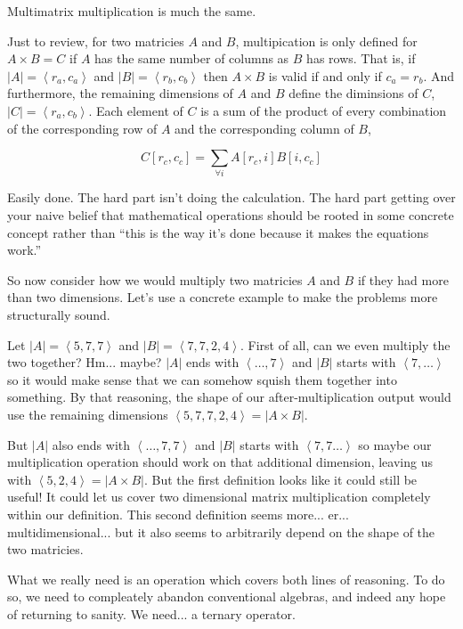 \documentclass[12pt]{book}
\theoremstyle{plain}
\theoremstyle{definition}
\theoremstyle{ppart}
\theoremstyle{case}
\theoremstyle{solution}
\newcommand{\shape}[1]{\left|#1\right|}
\begin{document}
Multimatrix multiplication is much the same.

Just to review, for two matricies $A$ and $B$, multipication is only defined
for $A \times B = C$ if $A$ has the same number of columns as $B$ has rows.
That is, if $\shape{A} = \left< r_a, c_a \right>$ and $\shape{B} = \left< r_b, c_b \right>$
then $A \times B$ is valid if and only if $c_a = r_b$. And furthermore,
the remaining dimensions of $A$ and $B$ define the diminsions of $C$,
$\shape{C} = \left< r_a, c_b \right>$. Each element of $C$ is a sum of the product of
every combination of the corresponding row of $A$ and the corresponding column of
$B$,

\[ C[r_c, c_c] = \sum_{\forall i} A[r_c, i] B[i, c_c] \]

Easily done. The hard part isn't doing the calculation. The hard part getting over
your naive belief that mathematical operations should be rooted in some concrete
concept rather than ``this is the way it's done because it makes the equations
work.''

So now consider how we would multiply two matricies $A$ and $B$ if they had more
than two dimensions. Let's use a concrete example to make the problems more
structurally sound.

Let $\shape{A} = \left<5,7,7\right>$ and $\shape{B} = \left<7,7,2,4\right>$.
First of all, can we even multiply the two together? Hm... maybe? $\shape{A}$ ends with
$\left<\ldots, 7\right>$ and $\shape{B}$ starts with $\left<7,\ldots\right>$ so it would
make sense that we can somehow squish them together into something. By that reasoning,
the shape of our after-multiplication output would use the remaining dimensions
$\left<5, 7, 7, 2, 4\right> = \shape{A \times B}$.

But $\shape{A}$ also ends with $\left<\ldots, 7, 7\right>$ and $\shape{B}$ starts with
$\left<7, 7\ldots\right>$ so maybe our multiplication operation should work on that
additional dimension, leaving us with $\left<5, 2, 4\right> = \shape{A \times B}$.
But the first definition looks like it could still be useful! It could let us cover 
two dimensional matrix multiplication completely within our definition. This second
definition seems more... er... multidimensional... but it also seems to
arbitrarily depend on the shape of the two matricies.

What we really need is an operation which covers both lines of reasoning. To do
so, we need to compleately abandon conventional algebras, and indeed any hope of
returning to sanity. We need... a ternary operator.
\end{document}

